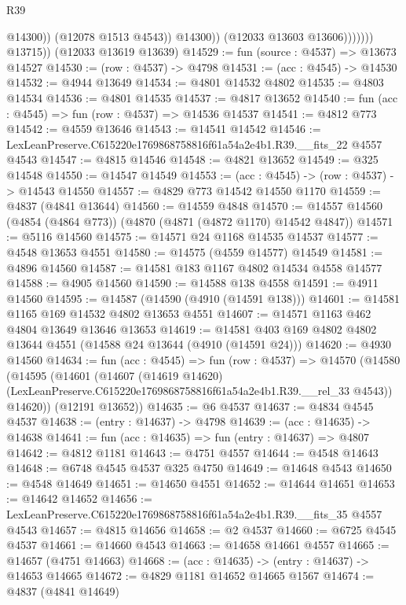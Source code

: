 \begin{lexlean}{R39}
\begin{coremodule}
                              @14300))
                          (@12078 @1513 @4543))
                        @14300))
                    (@12033 @13603 @13606)))))))
        @13715))
    (@12033 @13619 @13639)
@14529 := fun (source : @4537) => @13673 @14527
@14530 := (row : @4537) -> @4798
@14531 := (acc : @4545) -> @14530
@14532 := @4944 @13649
@14534 := @4801 @14532 @4802
@14535 := @4803 @14534
@14536 := @4801 @14535
@14537 := @4817 @13652
@14540 := fun (acc : @4545) => fun (row : @4537) => @14536 @14537
@14541 := @4812 @773
@14542 := @4559 @13646
@14543 := @14541 @14542
@14546 := LexLeanPreserve.C615220e1769868758816f61a54a2e4b1.R39.__fits_22 @4557 @4543
@14547 := @4815 @14546
@14548 := @4821 @13652
@14549 := @325 @14548
@14550 := @14547 @14549
@14553 := (acc : @4545) -> (row : @4537) -> @14543 @14550
@14557 := @4829 @773 @14542 @14550 @1170
@14559 := @4837 (@4841 @13644)
@14560 := @14559 @4848
@14570 := @14557 @14560 (@4854 (@4864 @773)) (@4870 (@4871 (@4872 @1170) @14542 @4847))
@14571 := @5116 @14560
@14575 := @14571 @24 @1168 @14535 @14537
@14577 := @4548 @13653 @4551
@14580 := @14575 (@4559 @14577) @14549
@14581 := @4896 @14560
@14587 := @14581 @183 @1167 @4802 @14534 @4558 @14577
@14588 := @4905 @14560
@14590 := @14588 @138 @4558
@14591 := @4911 @14560
@14595 := @14587 (@14590 (@4910 (@14591 @138)))
@14601 := @14581 @1165 @169 @14532 @4802 @13653 @4551
@14607 := @14571 @1163 @462 @4804 @13649 @13646 @13653
@14619 := @14581 @403 @169 @4802 @4802 @13644 @4551 (@14588 @24 @13644 (@4910 (@14591 @24)))
@14620 := @4930 @14560
@14634 := fun (acc : @4545) =>
  fun (row : @4537) =>
  @14570
    (@14580
      (@14595
        (@14601
          (@14607
            (@14619 @14620)
            (LexLeanPreserve.C615220e1769868758816f61a54a2e4b1.R39.__rel_33 @4543))
          @14620))
      (@12191 @13652))
@14635 := @6 @4537
@14637 := @4834 @4545 @4537
@14638 := (entry : @14637) -> @4798
@14639 := (acc : @14635) -> @14638
@14641 := fun (acc : @14635) => fun (entry : @14637) => @4807
@14642 := @4812 @1181
@14643 := @4751 @4557
@14644 := @4548 @14643
@14648 := @6748 @4545 @4537 @325 @4750
@14649 := @14648 @4543
@14650 := @4548 @14649
@14651 := @14650 @4551
@14652 := @14644 @14651
@14653 := @14642 @14652
@14656 := LexLeanPreserve.C615220e1769868758816f61a54a2e4b1.R39.__fits_35 @4557 @4543
@14657 := @4815 @14656
@14658 := @2 @4537
@14660 := @6725 @4545 @4537
@14661 := @14660 @4543
@14663 := @14658 @14661 @4557
@14665 := @14657 (@4751 @14663)
@14668 := (acc : @14635) -> (entry : @14637) -> @14653 @14665
@14672 := @4829 @1181 @14652 @14665 @1567
@14674 := @4837 (@4841 @14649)

\end{coremodule}
\end{lexlean}
